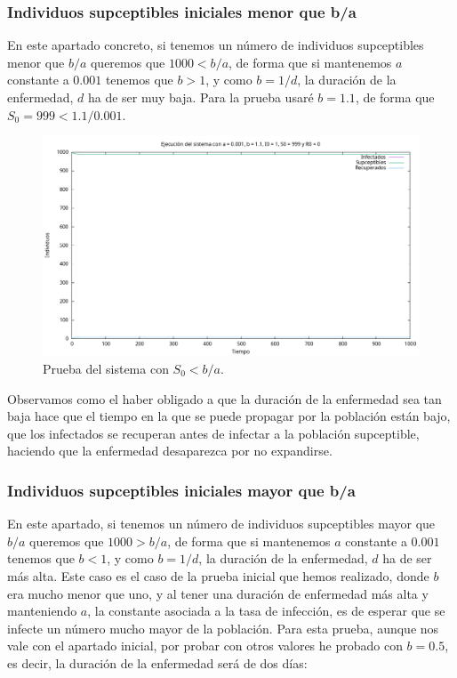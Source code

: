 \documentclass[12pt, spanish]{article}
\begin{document}
\subsubsection{Individuos supceptibles iniciales menor que b/a}

En este apartado concreto, si tenemos un número de individuos supceptibles menor que $b/a$ queremos que $1000 < b/a$, de forma que si mantenemos $a$ constante a $0.001$ tenemos que $b > 1$, y como $b = 1/d$, la duración de la enfermedad, $d$ ha de ser muy baja. Para la prueba usaré $b = 1.1$, de forma que $S_0 = 999 < 1.1/0.001$.

\begin{figure}[H]
  \centering
      \includegraphics[width=\textwidth]{SIR_s0_menor.png}
 		\caption{Prueba del sistema con $S_0 < b/a$.}
\end{figure}

Observamos como el haber obligado a que la duración de la enfermedad sea tan baja hace que el tiempo en la que se puede propagar por la población están bajo, que los infectados se recuperan antes de infectar a la población supceptible, haciendo que la enfermedad desaparezca por no expandirse.

\subsubsection{Individuos supceptibles iniciales mayor que b/a}

En este apartado, si tenemos un número de individuos supceptibles mayor que $b/a$ queremos que $1000 > b/a$, de forma que si mantenemos $a$ constante a $0.001$ tenemos que $b < 1$, y como $b = 1/d$, la duración de la enfermedad, $d$ ha de ser más alta. Este caso es el caso de la prueba inicial que hemos realizado, donde $b$ era mucho menor que uno, y al tener una duración de enfermedad más alta y manteniendo $a$, la constante asociada a la tasa de infección, es de esperar que se infecte un número mucho mayor de la población. Para esta prueba, aunque nos vale con el apartado inicial, por probar con otros valores he probado con $b = 0.5$, es decir, la duración de la enfermedad será de dos días:
\end{document}

